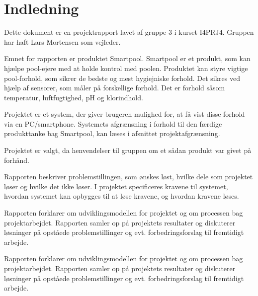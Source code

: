 \chapter{Indledning}





Dette dokument er en projektrapport lavet af gruppe 3 i kurset I4PRJ4. Gruppen har haft Lars Mortensen som vejleder. 

Emnet for rapporten er produktet Smartpool. Smartpool er et produkt, som kan hjælpe pool-ejere med at holde kontrol med poolen. Produktet kan styre vigtige pool-forhold, som sikrer de bedste og mest hygiejniske forhold. Det sikres ved hjælp af sensorer, som måler på forskellige forhold. Det er forhold såsom temperatur, luftfugtighed, pH og klorindhold. 

Projektet er et system, der giver brugeren mulighed for, at få vist disse forhold via en PC/smartphone. Systemets afgrænsning i forhold til den færdige produkttanke bag Smartpool, kan læses i afsnittet projektafgrænsning.

Projektet er valgt, da henvendelser til gruppen om et sådan produkt var givet på forhånd. 

Rapporten beskriver problemstillingen, som ønskes løst, hvilke dele som projektet løser og hvilke det ikke løser. I projektet specificeres kravene til systemet, hvordan systemet kan opbygges til at løse kravene, og hvordan kravene løses. 

Rapporten forklarer om udviklingsmodellen for projektet og om processen bag projektarbejdet. Rapporten samler op på projektets resultater og diskuterer løsninger på opståede problemstillinger og evt. forbedringsforslag til fremtidigt arbejde. 

Rapporten forklarer om udviklingsmodellen for projektet og om processen bag projektarbejdet. Rapporten samler op på projektets resultater og diskuterer løsninger på opståede problemstillinger og evt. forbedringsforslag til fremtidigt arbejde. 


